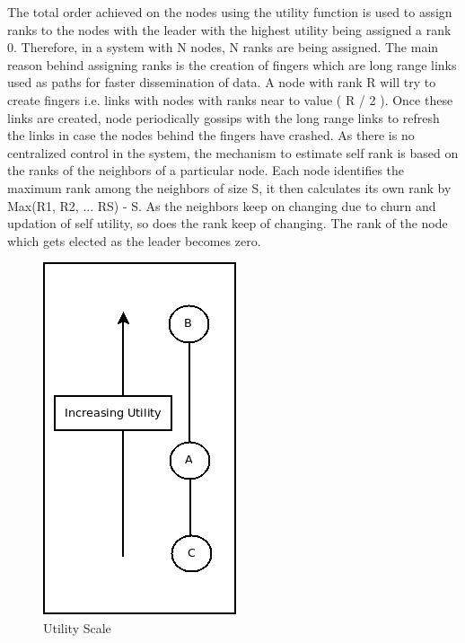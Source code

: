 \documentclass[12pt,a4paper,twoside,openright]{book}
\begin{document}
The total order achieved on the nodes using the utility function is used to assign ranks to the nodes with the leader with the highest utility being assigned a rank 0. Therefore, in a system with N nodes, N ranks are being assigned. The main reason behind assigning ranks is the creation of fingers which are long range links used as paths for faster dissemination of data. A node with rank R will try to create fingers i.e. links with nodes with ranks near to value ( R / 2 ). Once these links are created, node periodically gossips with the long range links to refresh the links in case the nodes behind the fingers have crashed. As there is no centralized control in the system, the mechanism to estimate self rank is based on the ranks of the neighbors of a particular node. Each node identifies the maximum rank among the neighbors of size S, it then calculates its own rank by Max(R1, R2, ... RS) - S. As the neighbors keep on changing due to churn and updation of self utility, so does the rank keep of changing. The rank of the node which gets elected as the leader becomes zero. 

\begin{figure}[h]
	\centering
	\includegraphics[scale=0.5]{preference}
	\caption{Utility Scale}
	\label{fig:preference}
\end{figure}
\end{document}
